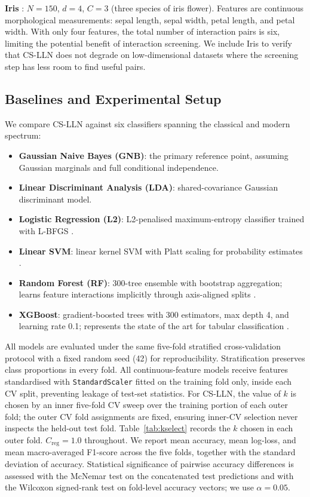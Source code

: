 \documentclass[conference]{IEEEtran}
\begin{document}
\noindent\textbf{Iris} \cite{fisher1936}: $N = 150$, $d = 4$, $C = 3$
(three species of iris flower).
Features are continuous morphological measurements: sepal length, sepal
width, petal length, and petal width.
With only four features, the total number of interaction pairs is six,
limiting the potential benefit of interaction screening.
We include Iris to verify that CS-LLN does not degrade on low-dimensional
datasets where the screening step has less room to find useful pairs.

\subsection{Baselines and Experimental Setup}
\label{sec:setup}

We compare CS-LLN against six classifiers spanning the classical and
modern spectrum:

\begin{itemize}
\item \textbf{Gaussian Naive Bayes (GNB)}: the primary reference point,
      assuming Gaussian marginals and full conditional independence.
\item \textbf{Linear Discriminant Analysis (LDA)}: shared-covariance Gaussian
      discriminant model.
\item \textbf{Logistic Regression (L2)}: L2-penalised maximum-entropy
      classifier trained with L-BFGS \cite{pedregosa2011}.
\item \textbf{Linear SVM}: linear kernel SVM with Platt scaling for
      probability estimates \cite{pedregosa2011}.
\item \textbf{Random Forest (RF)}: 300-tree ensemble with bootstrap
      aggregation; learns feature interactions implicitly through
      axis-aligned splits \cite{pedregosa2011}.
\item \textbf{XGBoost}: gradient-boosted trees with 300 estimators,
      max depth 4, and learning rate 0.1; represents the state of the
      art for tabular classification \cite{chen2016}.
\end{itemize}

All models are evaluated under the same five-fold stratified cross-validation
protocol with a fixed random seed (42) for reproducibility.
Stratification preserves class proportions in every fold.
All continuous-feature models receive features standardised with
\texttt{StandardScaler} fitted on the training fold only, inside each CV
split, preventing leakage of test-set statistics.
For CS-LLN, the value of $k$ is chosen by an inner five-fold CV sweep over
the training portion of each outer fold; the outer CV fold assignments are
fixed, ensuring inner-CV selection never inspects the held-out test fold.
Table~\ref{tab:kselect} records the $k$ chosen in each outer fold.
$C_{\text{reg}} = 1.0$ throughout.
We report mean accuracy, mean log-loss, and mean macro-averaged F1-score
across the five folds, together with the standard deviation of accuracy.
Statistical significance of pairwise accuracy differences is assessed with
the McNemar test \cite{dietterich1998} on the concatenated test predictions
and with the Wilcoxon signed-rank test on fold-level accuracy vectors; we
use $\alpha = 0.05$.
\end{document}
